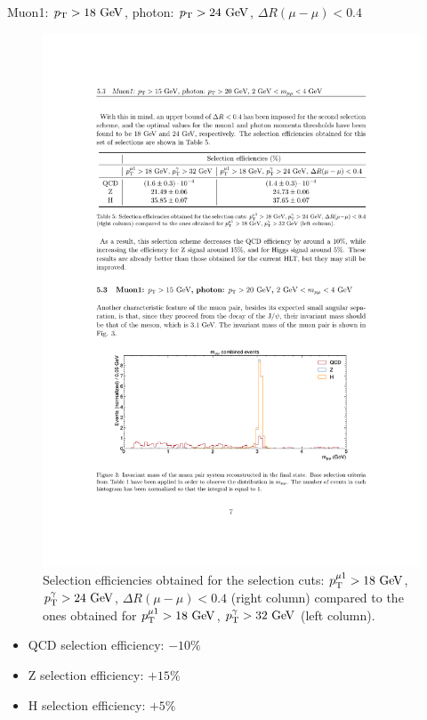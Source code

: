 \documentclass[aspectratio = 1610, xcolor = dvipsnames]{beamer}
\newcommand{\GeV}{\textrm{ }\mathrm{GeV}}
\newcommand{\pt}{p_{\rm T}}
\newcommand{\red}{\textcolor{unipd}}
\begin{document}
    \begin{frame}[t]{Muon1: $\pt > 18\GeV$, photon: $\pt>24\GeV$, $\Delta R(\mu-\mu)<0.4$}

        \begin{figure}[c]
            \centering
            \includegraphics[width=1\textwidth]{images/Mu18_Ph24_dR04_table.pdf}
            \caption{Selection efficiencies obtained for the selection cuts: $\pt^{\mu 1} > 18\GeV$, $\pt^{\gamma} > 24\GeV$, $\Delta R(\mu-\mu) <0.4$ (right column) compared to the ones obtained for $\pt^{\mu 1} > 18\GeV$, $\pt^{\gamma} > 32\GeV$ (left column).
            \label{im:Mu18_Ph24_dR04_table}}
        \end{figure}
        
        \begin{itemize}
            \item QCD selection efficiency: \red{$ - 10\%$}
            \item Z selection efficiency: \red{$ + 15\%$}
            \item H selection efficiency: \red{$ + 5\%$}
        \end{itemize}

    \end{frame}
\end{document}

